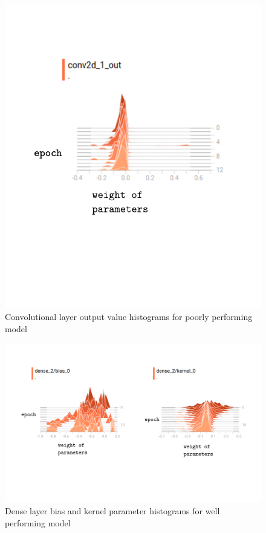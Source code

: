 \documentclass{article}
\begin{document}
{\begin{figure}[h]
  \includegraphics[scale=0.8]{badearlyout.pdf}
  \caption{Convolutional layer output value histograms for poorly performing model}
  \label{fig:badearlyout}
\end{figure}

\begin{figure}[h]
  \includegraphics[width=\linewidth]{gooddense.pdf}
  \caption{Dense layer bias and kernel parameter histograms for well performing model}
  \label{fig:gooddenseweights}
\end{figure}

}
\end{document}
